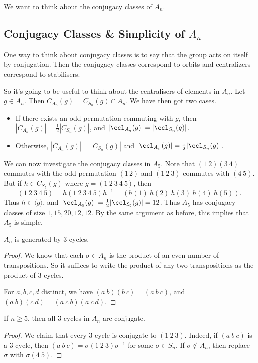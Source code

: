 \documentclass[a4paper]{scrartcl}
\begin{document}
We want to think about the conjugacy classes of $A_n$.

\subsection{Conjugacy Classes \& Simplicity of $A_n$}

One way to think about conjugacy classes is to say that the group acts on itself by conjugation. Then the conjugacy classes correspond to orbits and centralizers correspond to stabilisers.

So it's going to be useful to think about the centralisers of elements in $A_n$. 
Let $g \in A_n$. Then $C_{A_n}(g) = C_{S_n}(g) \cap A_n$. We have then got two cases.
\begin{itemize}
	\item If there exists an odd permutation commuting with $g$, then $|C_{A_n}(g)| = \frac{1}{2}|C_{S_n}(g)|$, and $|\ccl_{A_n}(g)| = |\ccl_{S_n}(g)|$.
	\item  Otherwise, $|C_{A_n}(g)| = |C_{S_n}(g)|$ and $|\ccl_{A_n}(g)| = \frac{1}{2}|\ccl_{S_n}(g)|$.
\end{itemize}

\begin{example}
	We can now investigate the conjugacy classes in $A_5$. Note that $(1\ 2)(3\ 4)$ commutes with the odd permutation $(1\ 2)$ and $(1\ 2\ 3)$ commutes with $(4\ 5)$. But if $h \in C_{S_5}(g)$ where $g = (1\ 2\ 3\ 4\ 5)$, then
	$$
(1\ 2\ 3\ 4\ 5) = h (1\ 2\ 3\ 4\ 5) h^{-1} = (h(1)\ h(2)\ h(3)\ h(4)\ h(5)).
	$$
	Thus $h \in \langle g \rangle$, and $|\ccl_{A_5}(g)| = \frac{1}{2}|\ccl_{S_5}(g)| = 12$. Thus $A_5$ has conjugacy classes of size $1, 15, 20, 12, 12$. By the same argument as before, this implies that $A_5$ is simple.
\end{example}

\begin{lemma}[Generators of $A_n$]
	$A_n$ is generated by 3-cycles.
\end{lemma}
\begin{proof}
	We know that each $\sigma \in A_n$ is the product of an even number of transpositions. So it suffices to write the product of any two transpositions as the product of 3-cycles. 

	For $a, b, c, d$ distinct, we have $(a\ b)(b\ c) = (a\ b\ c)$, and $(a\ b)(c\ d) = (a\ c\ b)(a\ c\ d)$.
\end{proof}

\begin{lemma}
	If $n \geq 5$, then all $3$-cycles in $A_n$ are conjugate.
\end{lemma}
\begin{proof}
	We claim that every 3-cycle is conjugate to $(1\ 2\ 3)$. Indeed, if $(a\ b\ c)$ is a 3-cycle, then $(a\ b\ c)=\sigma (1\ 2\ 3)\sigma^{-1}$ for some $\sigma \in S_n$. If $\sigma \not \in A_n$, then replace $\sigma$ with $\sigma (4\ 5)$.
\end{proof}
\end{document}
